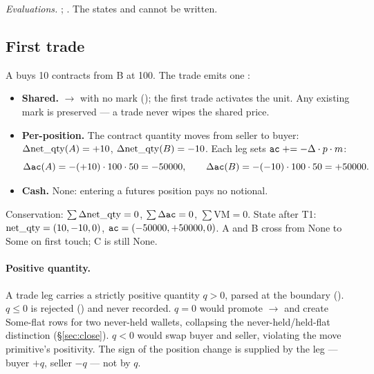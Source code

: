 {\raggedright\noindent\emph{Evaluations.}
;
. The states  and
 cannot be written.\par}

\subsection{First trade}
\label{sec:trade}

A buys 10 contracts from B at 100. The trade emits one :

\begin{itemize}
\item \textbf{Shared.}  $\to$  with no mark (); the
first trade activates the unit. Any existing mark is preserved --- a trade never wipes the shared price.
\item \textbf{Per-position.} The contract quantity moves from seller to buyer:
$\Delta\mathrm{net\_qty}(A)=+10$, $\Delta\mathrm{net\_qty}(B)=-10$. Each leg sets $\texttt{ac}\mathrel{+}=-\Delta\cdot p\cdot m$:
\[
\Delta\texttt{ac}(A) = -(+10)\cdot 100\cdot 50 = -50000,\qquad
\Delta\texttt{ac}(B) = -(-10)\cdot 100\cdot 50 = +50000.
\]
\item \textbf{Cash.} None: entering a futures position pays no notional.
\end{itemize}

\noindent Conservation: $\sum\Delta\mathrm{net\_qty} = 0$, $\sum\Delta\texttt{ac} = 0$, $\sum\mathrm{VM}=0$. State after
T1: $\mathrm{net\_qty}=(10,-10,0)$, $\texttt{ac}=(-50000,+50000,0)$. A and B cross from $\mathrm{None}$ to $\mathrm{Some}$
on first touch; C is still $\mathrm{None}$.

\paragraph{Positive quantity.} A trade leg carries a strictly positive quantity $q>0$, parsed at the
boundary (). $q\le 0$ is rejected () and never recorded. $q=0$
would promote $\to$ and create $\mathrm{Some}$-flat rows for two
never-held wallets, collapsing the never-held/held-flat distinction (\S\ref{sec:close}). $q<0$ would
swap buyer and seller, violating the move primitive's positivity. The sign of the position change is
supplied by the leg --- buyer $+q$, seller $-q$ --- not by $q$.


